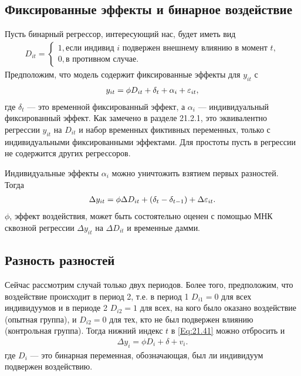 \subsection{Фиксированные эффекты и бинарное воздействие}

Пусть бинарный регрессор, интересующий нас, будет иметь вид 
\begin{align}
D_{it}=
\begin{cases}
 1, \text{если индивид $i$ подвержен внешнему влиянию в момент $t$}, \\
0, \text{в противном случае}.
\end{cases}
\label{Eq:22.39}
\end{align}
Предположим, что модель содержит фиксированные эффекты для $y_{it}$ с 
\begin{align}
y_{it}=\phi D_{it} + \delta_t + \alpha_i + \varepsilon_{it},
\label{Eq:22.40}
\end{align}
где $\delta_t$ --- это временной фиксированный эффект, а $\alpha_i$ --- индивидуальный фиксированный эффект. Как замечено в разделе 21.2.1, это эквивалентно регрессии $y_{it}$ на $D_{it}$ и набор временных фиктивных переменных, только с индивидуальными фиксированными эффектами. Для простоты пусть в регрессии не содержится других регрессоров.

Индивидуальные эффекты $\alpha_i$  можно уничтожить взятием первых разностей. Тогда
\begin{align}
\Delta y_{it}=\phi \Delta D_{it} + (\delta_t - \delta_{t-1}) + \Delta \varepsilon_{it}.
\label{Eq:22.41}
\end{align}
$\phi$, эффект воздействия, может быть состоятельно оценен с помощью МНК сквозной регрессии $\Delta y_{it}$ на $\Delta D_{it}$ и временные дамми.

\subsection{Разность разностей}

Сейчас рассмотрим случай только двух периодов. Более того, предположим, что воздействие происходит в период 2, т.е. в период 1 $D_{i1}=0$ для всех индивидуумов и в периоде 2 $D_{i2}=1$ для всех, на кого было оказано воздействие (опытная группа), и $D_{i2}=0$ для тех, кто не был подвержен влиянию (контрольная группа). Тогда нижний индекс $t$ в \ref{Eq:21.41} можно отбросить  и 
 \begin{align}
\Delta y_{i}=\phi  D_{i} + \delta+ v_{i}.
\label{Eq:22.42}
\end{align}
где $D_i$ --- это бинарная переменная, обозначающая, был ли индивидуум подвержен воздействию.

